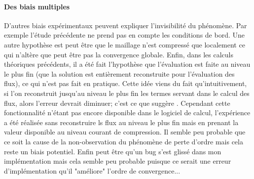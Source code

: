     \paragraph{Des biais multiples}
        D'autres biais expérimentaux peuvent expliquer l'invisibilité du phénomène.
        Par exemple l'étude précédente ne prend pas en compte les conditions de bord.
        Une autre hypothèse est peut être que le maillage n'est compressé que localement 
        ce qui n'altère que peut être pas la convergence globale. 
        Enfin, dans les calculs théoriques précédents, il a été fait l'hypothèse que l'évaluation est faite au niveau le plus fin 
        (que la solution est entièrement reconstruite pour l'évaluation des flux), ce qui n'est pas fait en pratique. Cette idée viens du fait qu'intuitivement, 
        si l'on reconstruit jusqu'au niveau le plus fin les termes servant dans le calcul des flux, alors l'erreur devrait diminuer; c'est ce que suggère \cite{belloti_et_al_2025}.
        Cependant cette fonctionnalité n'étant pas encore disponible dans le logiciel de calcul, l'expérience a été réalisée sans reconstruire ls flux au niveau 
        le plus fin mais en prenant la valeur disponible au niveau courant de compression. Il semble peu probable que ce soit la cause de la non-observation du phénomène 
        de perte d'ordre mais cela reste un biais potentiel. Enfin peut être qu'un bug s'est glissé dans mon implémentation mais cela semble peu probable 
        puisque ce serait une erreur d'implémentation qu'il "améliore" l'ordre de convergence...
